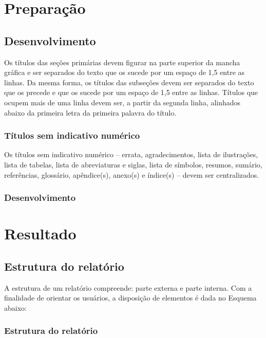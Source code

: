 \documentclass{Arquivos/TrabalhoAcademico}
\begin{document}
\part{Preparação} %

\chapter{Desenvolvimento}
Os títulos das seções primárias devem figurar na parte superior da mancha gráfica e ser separados do
texto que os sucede por um espaço de 1,5 entre as linhas. Da mesma forma, os títulos das subseções
devem ser separados do texto que os precede e que os sucede por um espaço de 1,5 entre as linhas.
Títulos que ocupem mais de uma linha devem ser, a partir da segunda linha, alinhados abaixo da
primeira letra da primeira palavra do título.


\section{Títulos sem indicativo numérico}
Os títulos sem indicativo numérico – errata, agradecimentos, lista de ilustrações, lista de tabelas, lista
de abreviaturas e siglas, lista de símbolos, resumos, sumário, referências, glossário, apêndice(s),
anexo(s) e índice(s) – devem ser centralizados.

\section{Desenvolvimento}
\lipsum[1]


\part{Resultado} %

\chapter{Estrutura do relatório}
A estrutura de um relatório compreende: parte externa e parte interna.
Com a finalidade de orientar os usuários, a disposição de elementos é dada no Esquema abaixo:

\newpage
\section{Estrutura do relatório}
\end{document}
